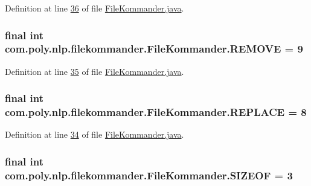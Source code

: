 Definition at line \hyperlink{L36}{36} of file \hyperlink{}{File\-Kommander.\-java}.

\hypertarget{classcom_1_1poly_1_1nlp_1_1filekommander_1_1_file_kommander_ae5cf939b72c1ec4e11127b45fdd5e637}{
\subsubsection[{R\-E\-M\-O\-V\-E}]{\setlength{\rightskip}{0pt plus 5cm}final int com.\-poly.\-nlp.\-filekommander.\-File\-Kommander.\-R\-E\-M\-O\-V\-E = 9\hspace{0.3cm}{\ttfamily [static]}}}\label{classcom_1_1poly_1_1nlp_1_1filekommander_1_1_file_kommander_ae5cf939b72c1ec4e11127b45fdd5e637}


Definition at line \hyperlink{L35}{35} of file \hyperlink{}{File\-Kommander.\-java}.

\hypertarget{classcom_1_1poly_1_1nlp_1_1filekommander_1_1_file_kommander_a43509f431e53076b0419cd5560077132}{
\subsubsection[{R\-E\-P\-L\-A\-C\-E}]{\setlength{\rightskip}{0pt plus 5cm}final int com.\-poly.\-nlp.\-filekommander.\-File\-Kommander.\-R\-E\-P\-L\-A\-C\-E = 8\hspace{0.3cm}{\ttfamily [static]}}}\label{classcom_1_1poly_1_1nlp_1_1filekommander_1_1_file_kommander_a43509f431e53076b0419cd5560077132}


Definition at line \hyperlink{L34}{34} of file \hyperlink{}{File\-Kommander.\-java}.

\hypertarget{classcom_1_1poly_1_1nlp_1_1filekommander_1_1_file_kommander_a6775052df5b5feaa10c69e1496e59f67}{
\subsubsection[{S\-I\-Z\-E\-O\-F}]{\setlength{\rightskip}{0pt plus 5cm}final int com.\-poly.\-nlp.\-filekommander.\-File\-Kommander.\-S\-I\-Z\-E\-O\-F = 3\hspace{0.3cm}{\ttfamily [static]}}}\label{classcom_1_1poly_1_1nlp_1_1filekommander_1_1_file_kommander_a6775052df5b5feaa10c69e1496e59f67}


